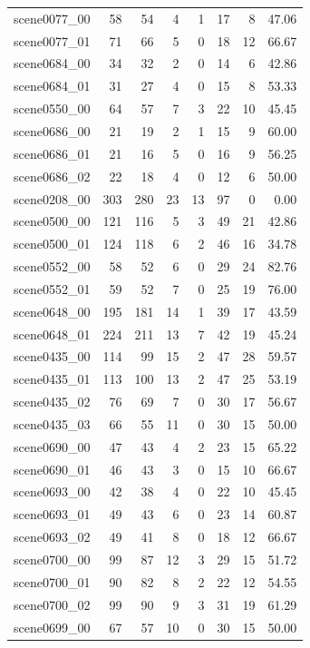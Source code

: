 \begin{table}[t]
\begin{tabular}{lrrrrrrr}
scene0077\_00 & 58 & 54 & 4 & 1 & 17 & 8 & 47.06 \\
scene0077\_01 & 71 & 66 & 5 & 0 & 18 & 12 & 66.67 \\
scene0684\_00 & 34 & 32 & 2 & 0 & 14 & 6 & 42.86 \\
scene0684\_01 & 31 & 27 & 4 & 0 & 15 & 8 & 53.33 \\
scene0550\_00 & 64 & 57 & 7 & 3 & 22 & 10 & 45.45 \\
scene0686\_00 & 21 & 19 & 2 & 1 & 15 & 9 & 60.00 \\
scene0686\_01 & 21 & 16 & 5 & 0 & 16 & 9 & 56.25 \\
scene0686\_02 & 22 & 18 & 4 & 0 & 12 & 6 & 50.00 \\
scene0208\_00 & 303 & 280 & 23 & 13 & 97 & 0 & 0.00 \\
scene0500\_00 & 121 & 116 & 5 & 3 & 49 & 21 & 42.86 \\
scene0500\_01 & 124 & 118 & 6 & 2 & 46 & 16 & 34.78 \\
scene0552\_00 & 58 & 52 & 6 & 0 & 29 & 24 & 82.76 \\
scene0552\_01 & 59 & 52 & 7 & 0 & 25 & 19 & 76.00 \\
scene0648\_00 & 195 & 181 & 14 & 1 & 39 & 17 & 43.59 \\
scene0648\_01 & 224 & 211 & 13 & 7 & 42 & 19 & 45.24 \\
scene0435\_00 & 114 & 99 & 15 & 2 & 47 & 28 & 59.57 \\
scene0435\_01 & 113 & 100 & 13 & 2 & 47 & 25 & 53.19 \\
scene0435\_02 & 76 & 69 & 7 & 0 & 30 & 17 & 56.67 \\
scene0435\_03 & 66 & 55 & 11 & 0 & 30 & 15 & 50.00 \\
scene0690\_00 & 47 & 43 & 4 & 2 & 23 & 15 & 65.22 \\
scene0690\_01 & 46 & 43 & 3 & 0 & 15 & 10 & 66.67 \\
scene0693\_00 & 42 & 38 & 4 & 0 & 22 & 10 & 45.45 \\
scene0693\_01 & 49 & 43 & 6 & 0 & 23 & 14 & 60.87 \\
scene0693\_02 & 49 & 41 & 8 & 0 & 18 & 12 & 66.67 \\
scene0700\_00 & 99 & 87 & 12 & 3 & 29 & 15 & 51.72 \\
scene0700\_01 & 90 & 82 & 8 & 2 & 22 & 12 & 54.55 \\
scene0700\_02 & 99 & 90 & 9 & 3 & 31 & 19 & 61.29 \\
scene0699\_00 & 67 & 57 & 10 & 0 & 30 & 15 & 50.00 \\

\end{tabular}
\end{table}
